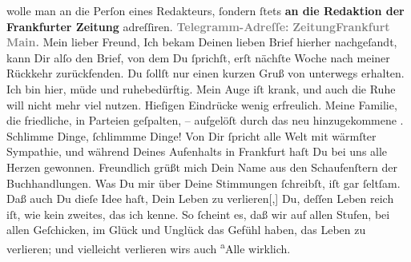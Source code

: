 \begin{ledgroupsized}[t]{13cm}
{{{{{{                                 wolle man  an die Perſon eines
                                 Redakteurs, ſondern ſtets \textbf{an die Redaktion der Frankfurter Zeitung} adreſſiren}}.}}}}\pend
           \pstart
           \textcolor{gray}{\textbf{Telegramm-Adreſſe:}}\pend
           \pstart
           \textcolor{gray}{\textbf{\textbf{ZeitungFrankfurt Main.}}}\pend
           \pstart\center{}Mein lieber Freund,\pend\pstart
           Ich bekam Deinen lieben Brief hierher nachgeſandt, kann Dir alſo den Brief, von dem
               Du ſprichſt, erſt nächſte Woche nach meiner Rückkehr zurückfenden.\pend
           \pstart
           Du ſollſt nur einen kurzen Gruß von unterwegs erhalten. Ich bin hier, müde und
               ruhebedürftig. Mein  Auge iſt krank, und  auch die Ruhe will nicht mehr viel nutzen. Hieſigen
               Eindrücke wenig erfreulich. Meine Familie, die {\pb}friedliche, in  Parteien geſpalten, – aufgelöſt durch das neu hinzugekommene \label{K_L02771-1v}\label{K_L02771-1h}.
               Schlimme Dinge, ſchlimmme Dinge! \pend
           \pstart
           Von Dir ſpricht alle Welt mit wärmſter Sympathie, und während Deines Aufenhalts in
                  Frankfurt haſt Du bei uns alle Herzen
               gewonnen. Freundlich grüßt mich Dein Name aus den Schaufenſtern der
               Buchhandlungen.\pend
           \pstart
           Was Du mir über Deine Stimmungen ſchreibſt, iſt gar ſeltſam. Daß auch Du dieſe Idee
               haſt, Dein Leben zu verlieren{[},{]}{ }{\pb}Du, deſſen Leben reich iſt, wie kein zweites, das
               ich kenne. So ſcheint es, daß \strikeout{\textcolor{gray}{×}} wir auf allen Stufen, bei allen Geſchicken, im Glück und Unglück das Gefühl
               haben, das Leben zu verlieren; und vielleicht verlieren wirs auch \substVorne{}\textsuperscript{a}\substDazwischen{}A\substHinten{}lle wirklich.\pend

\end{ledgroupsized}
